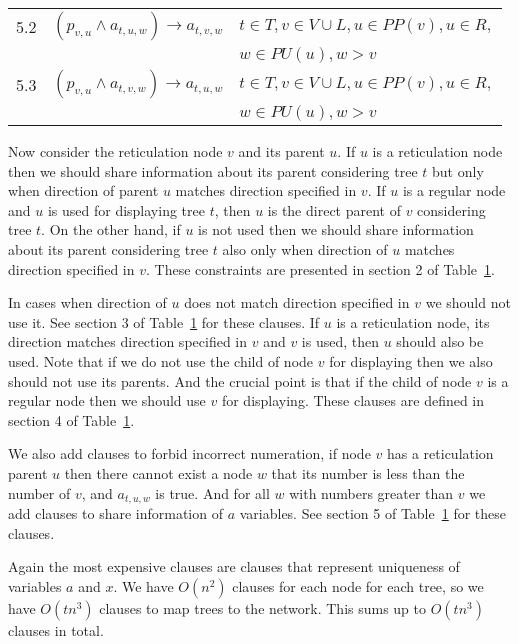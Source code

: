 \documentclass[runningheads, envcountsame, a4paper]{llncs}
\begin{document}
\begin{table}[t]
\begin{tabular}{l | l | l}
  5.2 &
  $(p_{v,u} \wedge a_{t,u,w}) \rightarrow a_{t,v,w}$ &
  $t \in T,v \in V \cup L, u \in PP(v), u \in R,$
  \\ & & $w \in PU(u), w > v$
  \\
  
  5.3 &
  $(p_{v,u} \wedge a_{t,v,w}) \rightarrow a_{t,u,w}$ &
  $t \in T,v \in V \cup L, u \in PP(v), u \in R,$
  \\ & & $w \in PU(u), w > v$
  \\

\end{tabular}
\label{child-parent-table}
\end{table}

Now consider the reticulation node $v$ and its parent $u$. If $u$ is a reticulation node then we should share information 
about its parent considering tree $t$ but only when direction of parent $u$ matches direction specified in $v$. 
If $u$ is a regular node and $u$ is used for displaying tree $t$, then $u$ is the direct parent of $v$ considering tree $t$.
On the other hand, if $u$ is not used then we should share information about its parent considering tree $t$ also 
only when direction of $u$ matches direction specified in $v$. These constraints are presented in section 2 of Table~\ref{child-parent-table}.

In cases when direction of $u$ does not match direction specified in $v$ we should not use it. See section 3 of Table~\ref{child-parent-table} 
for these clauses. If $u$ is a reticulation node, its direction matches direction specified in $v$ and $v$ is used, then $u$ should also be used.
Note that if we do not use the child of node $v$ for displaying then we also should not use its parents. And the crucial point is that
if the child of node $v$ is a regular node then we should use $v$ for displaying. 
These clauses are defined in section 4 of Table~\ref{child-parent-table}.

We also add clauses to forbid incorrect numeration, if node $v$ has a reticulation parent $u$ then there cannot 
exist a node $w$ that its number is less than the number of $v$, and $a_{t,u,w}$ is true. And for all $w$ with numbers 
greater than $v$ we add clauses to share information of $a$ variables. See section 5 of Table~\ref{child-parent-table} for these clauses.

Again the most expensive clauses are clauses that represent uniqueness of variables $a$ and $x$. We have $O(n^2)$ clauses for
each node for each tree, so we have $O(tn^3)$ clauses to map trees to the network. This sums up to $O(tn^3)$ clauses in total.
\end{document}
